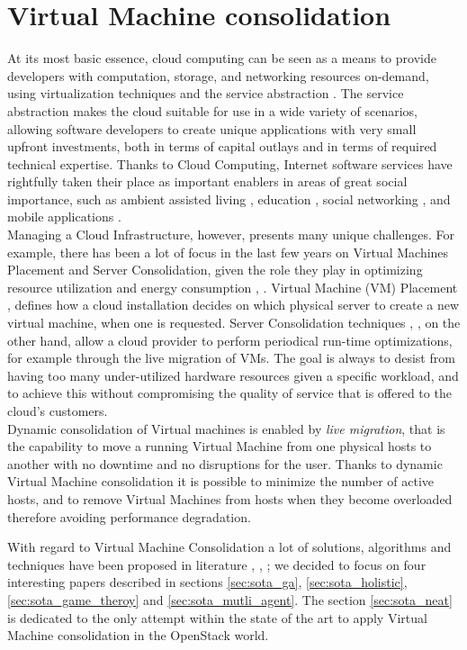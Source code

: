 \section{Virtual Machine consolidation}
\label{sec:sota_vm_cons}
At its most basic essence, cloud computing can be seen as a means to provide developers with computation, storage, and networking resources on-demand, using virtualization techniques and the service abstraction \cite{Armbrust:2010ee}. The service abstraction makes the cloud suitable for use in a wide variety of scenarios, allowing software developers to create unique applications with very small upfront investments, both in terms of capital outlays and in terms of required technical expertise. Thanks to Cloud Computing, Internet software services have rightfully taken their place as important enablers in areas of great social importance, such as ambient assisted living \cite{Zhang:2011dq}, education \cite{Sultan:2010fd}, social networking \cite{Chard:2010eh}, and mobile applications \cite{Fernando:2013ip}.\\
Managing a Cloud Infrastructure, however, presents many unique challenges. For example, there has been a lot of focus in the last few years on Virtual Machines Placement and Server Consolidation, given the role they play in optimizing resource utilization and energy consumption \cite{Feller:2012kf}, \cite{Goudarzi:2012gw}. Virtual Machine (VM) Placement \cite{Meng:2010im}, \cite{Xu:2010df} defines how a cloud installation decides on which physical server to create a new virtual machine, when one is requested. Server Consolidation techniques \cite{Wuhib:2012vq}, \cite{Corradi:2014fe}, on the other hand, allow a cloud provider to perform periodical run-time optimizations, for example through the live migration of VMs. The goal is always to desist from having too many under-utilized hardware resources given a specific workload, and to achieve this without compromising the quality of service that is offered to the cloud’s customers.\\
Dynamic consolidation of Virtual machines is enabled by \textit{live migration}, that is the capability to move a running Virtual Machine from one physical hosts to another with no downtime and no disruptions for the user. Thanks to dynamic Virtual Machine consolidation it is possible to minimize the number of active hosts, and to remove Virtual Machines from hosts when they become overloaded therefore avoiding performance degradation.

With regard to Virtual Machine Consolidation a lot of solutions, algorithms and techniques have been proposed in literature \cite{He:2012jr}, \cite{Wuhib:2012vq}, \cite{Corradi:2014fe}; we decided to focus on four interesting papers described in sections \ref{sec:sota_ga}, \ref{sec:sota_holistic}, \ref{sec:sota_game_theroy} and \ref{sec:sota_mutli_agent}. The section \ref{sec:sota_neat} is dedicated to the only attempt within the state of the art to apply Virtual Machine consolidation in the OpenStack world.

